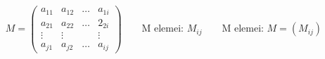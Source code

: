 \documentclass{article}
\begin{document}
$$
M =
\begin{pmatrix}
	a_{11} & a_{12} & \hdots & a_{1i}\\
	a_{21} & a_{22} & \hdots & 2_{2i}\\
	\vdots & \vdots & & \vdots \\
	a_{j1} & a_{j2} & \hdots & a_{ij}
\end{pmatrix}
\qquad\text{M elemei: } M_{ij}
\qquad\text{M elemei: } M=\left(M_{ij}\right)
$$


\thispagestyle{empty}%
\end{document}
